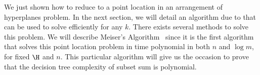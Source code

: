 We just shown how to reduce \kSUM to a point location in an arrangement of
hyperplanes problem. In the next section, we will detail an algorithm due to
\citet*{meiser:1993} that can be used to solve \kSUM efficiently for any $k$.
There exists several methods to solve this problem. We will describe Meiser's
Algorithm~\cite{meiser:1993} since it is the first algorithm that solves this
point location problem in time polynomial in both $n$ and $\log m$, for fixed
$\H$ and $n$. This particular algorithm will give us the occasion to prove that
the decision tree complexity of subset sum is polynomial.

